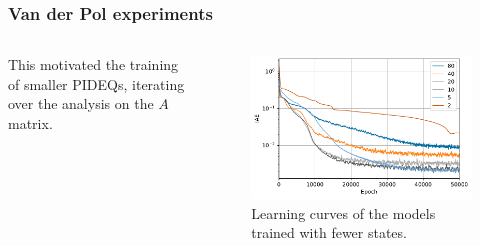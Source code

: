 \documentclass[t]{beamer}
\begin{document}
\begin{frame}
    \frametitle{Van der Pol experiments}
    \begin{columns}[c]
    \begin{column}{.4\textwidth}
	This motivated the training of smaller PIDEQs, iterating over the analysis on the $A$ matrix.
    \end{column}
    \begin{column}{.6\textwidth}
	\begin{figure}[h]
	    \centering
	    \includegraphics[width=\textwidth]{../images/exp_2_iae.pdf}
	    \caption{Learning curves of the models trained with fewer states.}
	    \label{fig:states-iae}
	\end{figure}
    \end{column}
    \end{columns}
\end{frame}
\end{document}

